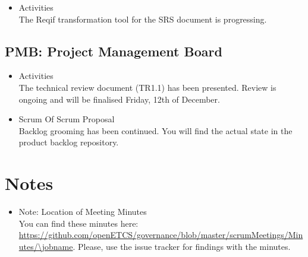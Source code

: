 \documentclass[a4paper, 11pt]{article}
\begin{document}
\begin{itemize}
\item Activities\\
The Reqif transformation tool for the SRS document is progressing. 
\end{itemize}

\subsection{PMB: Project Management Board}
\begin{itemize}

\item Activities\\
The technical review document (TR1.1) has been presented. Review is ongoing and will be finalised Friday, 12th of December.

\item Scrum Of Scrum Proposal\\
Backlog grooming has been continued. You will find the actual state in the product backlog repository.

\end{itemize}

\section{Notes}
\begin{itemize}

\item Note: Location of Meeting Minutes\\
You can find these minutes here: \url{https://github.com/openETCS/governance/blob/master/scrumMeetings/Minutes/\jobname}. Please, use the issue tracker for findings with the minutes.

\end{itemize}
\end{document}
